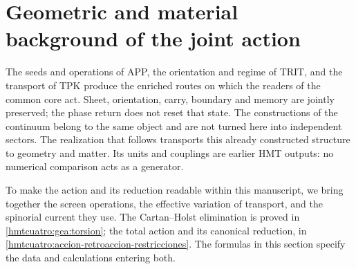 \section{Geometric and material background of the joint action}
\label{hmtcuatro:ant:seccion}

The seeds and operations of APP, the orientation and regime of TRIT, and the transport of TPK produce the enriched routes on which the readers of the common core act. Sheet, orientation, carry, boundary and memory are jointly preserved; the phase return does not reset that state. The constructions of the continuum belong to the same object and are not turned here into independent sectors. The realization that follows transports this already constructed structure to geometry and matter. Its units and couplings are earlier HMT outputs: no numerical comparison acts as a generator.

To make the action and its reduction readable within this manuscript, we bring together the screen operations, the effective variation of transport, and the spinorial current they use. The Cartan--Holst elimination is proved in \ref{hmtcuatro:gea:torsion}; the total action and its canonical reduction, in \ref{hmtcuatro:accion-retroaccion-restricciones}. The formulas in this section specify the data and calculations entering both.

